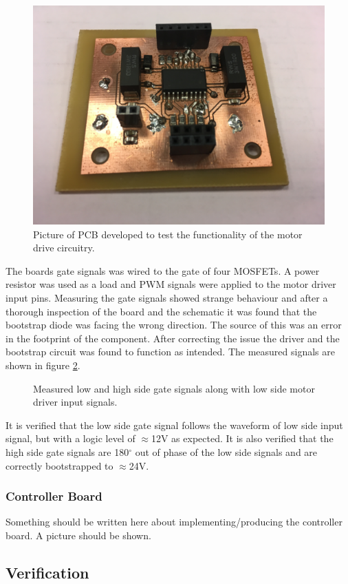 \begin{figure}
	\centering
	\includegraphics[width=0.5\linewidth]{graphics/hipboard_pic}
	\caption[Prototype PCB with motor driver.]{Picture of PCB developed to test the functionality of the motor drive circuitry.}
	\label{fig:m_drive_circuit}
\end{figure}
The boards gate signals was wired to the gate of four MOSFETs.
A power resistor was used as a load and PWM signals were applied to the motor driver input pins. 
Measuring the gate signals showed strange behaviour and after a thorough inspection of the board and the schematic it was found that the bootstrap diode was facing the wrong direction. 
The source of this was an error in the footprint of the component. 
After correcting the issue the driver and the bootstrap circuit was found to function as intended. 
The measured signals are shown in figure \ref{fig:test_hip_signals}.

\begin{figure}[h]
	\centering
    
	\caption[Measured gate and input signals.]{Measured low and high side gate signals along with low side motor driver input signals.}
	\label{fig:test_hip_signals}
\end{figure}
It is verified that the low side gate signal follows the waveform of low side input signal, but with a logic level of $\approx$12V as expected. 
It is also verified that the high side gate signals are 180$^\circ$ out of phase of the low side signals and are correctly bootstrapped to $\approx$24V.

\subsubsection{Controller Board} %
\label{ssub:controller_board}
Something should be written here about implementing/producing the controller board.
A picture should be shown.

\subsection{Verification} %
\label{ssub:verifaction}

